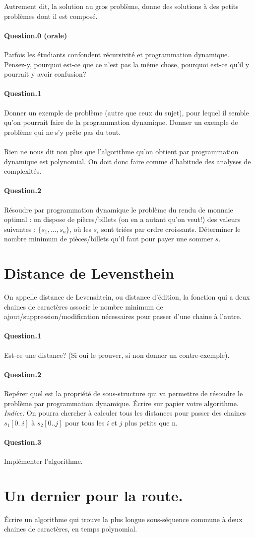 \documentclass[10pt,a4paper]{article}
\begin{document}
Autrement dit, la solution au gros problème, donne des solutions à des petits
problèmes dont il est composé.


\paragraph{Question.0 (orale)} Parfois les étudiants confondent récursivité et
programmation dynamique. Pensez-y, pourquoi est-ce que ce n'est pas la
même chose, pourquoi est-ce qu'il y pourrait y avoir confusion?

\paragraph{Question.1} Donner un exemple de problème (autre que ceux du sujet),
pour lequel il semble qu'on pourrait faire de la programmation dynamique. Donner
un exemple de problème qui ne s'y prête pas du tout.
\\\\
Rien ne nous dit non plus que l'algorithme qu'on obtient par programmation
dynamique est polynomial. On doit donc faire comme d'habitude des analyses de
complexités.
\paragraph{Question.2} Résoudre par programmation dynamique le problème du rendu
de monnaie optimal : on dispose de pièces/billets (on en a autant qu'on veut!)
des valeurs suivantes : $\{s_1,\dots,s_n\}$, où les $s_i$ sont triées par ordre
croissants. Déterminer le nombre minimum de pièces/billets qu'il faut pour payer
une sommer $s$.  


\section{Distance de Levensthein}

On appelle distance de Levenshtein, ou distance d'édition, la fonction
qui a deux chaines de caractères associe le nombre minimum de
ajout/suppression/modification nécessaires pour passer d'une chaine à l'autre.

\paragraph{Question.1} Est-ce une distance? (Si oui le prouver, si non donner
un contre-exemple).
\paragraph{Question.2} Repérer quel est la propriété de sous-structure qui va
permettre de résoudre le problème par programmation dynamique. Écrire sur papier
votre algorithme. \emph{Indice:} On pourra chercher à calculer tous les
distances pour passer des chaines $s_1 [0..i]$ à $s_2 [0 .. j]$ pour tous les
$i$ et $j$ plus petits que n.
\paragraph{Question.3} Implémenter l'algorithme.


\section{Un dernier pour la route.}
Écrire un algorithme qui trouve la plus longue sous-séquence commune à deux
chaines de caractères, en temps polynomial.
\end{document}
